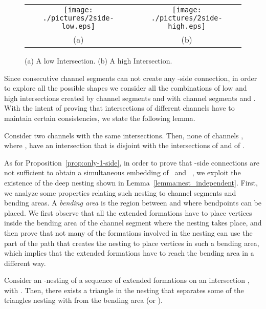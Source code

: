 \documentclass[a4paper,10pt]{llncs}
\newcounter{prop}
\newcommand{\T}{\mbox{ }}
\renewcommand{\P}{\mbox{ }}
\begin{document}
\begin{figure}[htb]
\begin{center}
\begin{tabular}{c c}
\mbox{\texttt{[image: ./pictures/2side-low.eps]}} \hspace{2cm} &
\mbox{\texttt{[image: ./pictures/2side-high.eps]}} \\
(a) \hspace{2cm} & (b)\\
\end{tabular}
\caption{(a) A low Intersection. (b) A high Intersection.}
\label{fig:intersection}
\end{center}
\end{figure}

Since consecutive channel segments can not create any -side connection, in order to explore all the possible shapes we consider all the combinations of low and high intersections created by channel segments  and  with channel segments  and .
With the intent of proving that intersections of different channels have to maintain certain consistencies, we state the following lemma.

\begin{lemma}\label{lem:2-different-shapes}
Consider two channels  with the same intersections. Then, none of channels , where , have an intersection that is disjoint with the intersections of  and of .
\end{lemma}

As for Proposition~\ref{prop:only-1-side}, in order to prove that -side connections are not sufficient to obtain a simultaneous embedding of \T and \P, we exploit the existence of the deep nesting shown in Lemma~\ref{lemma:nest_independent}. First, we analyze some properties relating such nesting to channel segments and bending areas. A \emph{bending area}  is the region between  and  where bendpoints can be placed. We first observe that all the extended formations have to place vertices inside the bending area of the channel segment where the nesting takes place, and then prove that not many of the formations involved in the nesting can use the part of the path that creates the nesting to place vertices in such a bending area, which implies that the extended formations have to reach the bending area in a different way.

\begin{lemma}\label{lem:nesting-bending-area}
Consider an -nesting of a sequence of extended formations on an intersection , with .
Then, there exists a triangle  in the nesting that separates some of the triangles nesting with  from the bending area  (or ).
\end{lemma}
\end{document}
